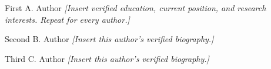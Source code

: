 \documentclass[10pt,journal]{IEEEtran}
\newcommand{\placeholder}[1]{\textit{[#1]}}
\begin{document}
\begin{IEEEbiographynophoto}{First A. Author}
\placeholder{Insert verified education, current position, and research
interests. Repeat for every author.}
\end{IEEEbiographynophoto}

\begin{IEEEbiographynophoto}{Second B. Author}
\placeholder{Insert this author's verified biography.}
\end{IEEEbiographynophoto}

\begin{IEEEbiographynophoto}{Third C. Author}
\placeholder{Insert this author's verified biography.}
\end{IEEEbiographynophoto}
\fi
\end{document}

